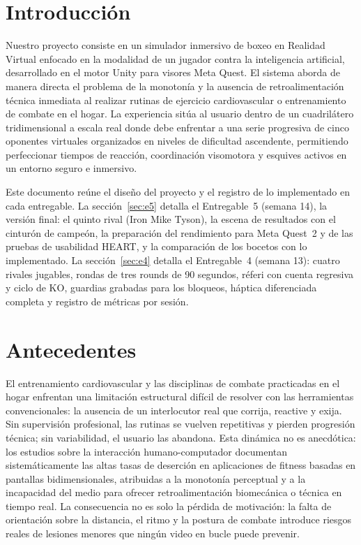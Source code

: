 \section{Introducción}
Nuestro proyecto consiste en un simulador inmersivo de boxeo en Realidad Virtual enfocado en la modalidad de un jugador contra la inteligencia artificial, desarrollado en el motor Unity para visores Meta Quest. El sistema aborda de manera directa el problema de la monotonía y la ausencia de retroalimentación técnica inmediata al realizar rutinas de ejercicio cardiovascular o entrenamiento de combate en el hogar. La experiencia sitúa al usuario dentro de un cuadrilátero tridimensional a escala real donde debe enfrentar a una serie progresiva de cinco oponentes virtuales organizados en niveles de dificultad ascendente, permitiendo perfeccionar tiempos de reacción, coordinación visomotora y esquives activos en un entorno seguro e inmersivo.

Este documento reúne el diseño del proyecto y el registro de lo implementado en cada entregable. La sección~\ref{sec:e5} detalla el Entregable~5 (semana 14), la versión final: el quinto rival (Iron Mike Tyson), la escena de resultados con el cinturón de campeón, la preparación del rendimiento para Meta Quest~2 y de las pruebas de usabilidad HEART, y la comparación de los bocetos con lo implementado. La sección~\ref{sec:e4} detalla el Entregable~4 (semana 13): cuatro rivales jugables, rondas de tres rounds de 90 segundos, réferi con cuenta regresiva y ciclo de KO, guardias grabadas para los bloqueos, háptica diferenciada completa y registro de métricas por sesión.

\section{Antecedentes}
El entrenamiento cardiovascular y las disciplinas de combate practicadas en el hogar enfrentan una limitación estructural difícil de resolver con las herramientas convencionales: la ausencia de un interlocutor real que corrija, reactive y exija. Sin supervisión profesional, las rutinas se vuelven repetitivas y pierden progresión técnica; sin variabilidad, el usuario las abandona. Esta dinámica no es anecdótica: los estudios sobre la interacción humano-computador documentan sistemáticamente las altas tasas de deserción en aplicaciones de fitness basadas en pantallas bidimensionales, atribuidas a la monotonía perceptual y a la incapacidad del medio para ofrecer retroalimentación biomecánica o técnica en tiempo real. La consecuencia no es solo la pérdida de motivación: la falta de orientación sobre la distancia, el ritmo y la postura de combate introduce riesgos reales de lesiones menores que ningún video en bucle puede prevenir.

